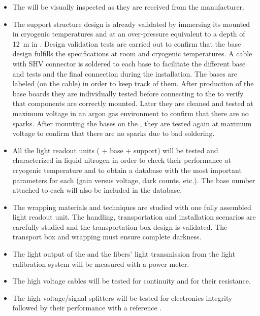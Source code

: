 \begin{itemize}
\item The  will be visually inspected as they are received from the manufacturer.

\item 
The  support structure design is already validated by immersing its mounted  in cryogenic temperatures and at an over-pressure equivalent to a depth of \SI{12}{m} in \lar{}. Design validation tests are carried out to confirm that the  base design fulfills the specifications at room and cryogenic temperatures. A cable with SHV connector is soldered to each  base to facilitate the different base and  tests and the final  connection during the installation. The  bases are labeled (on the cable) in order to keep track of them. After production of the  base boards they are individually tested before connecting to the  to verify that components are correctly mounted. Later they are cleaned and tested at maximum voltage in an argon gas environment to confirm that there are no sparks. After mounting the bases on the , they are tested again %
at maximum voltage to confirm that there are no sparks due to bad soldering.

\item All the light readout units ( + base + support) will be tested and characterized in liquid nitrogen in order to check their performance at cryogenic temperature and to obtain a database with the most important parameters for each  (gain versus voltage, dark counts, etc.). The  base number attached to each  will also be included in the database.

\item The wrapping materials and techniques are studied with one fully assembled light readout unit. The handling, transportation and installation scenarios are carefully studied and the transportation box design is validated. The transport box and  wrapping must  ensure complete darkness.

\item The light output of the  and the fibers' light transmission from the light calibration system will be measured with a power meter.

\item The high voltage cables will be tested for continuity and for their resistance.

\item The high voltage/signal splitters will be tested for electronics integrity followed by their performance with a reference .

\end{itemize}

